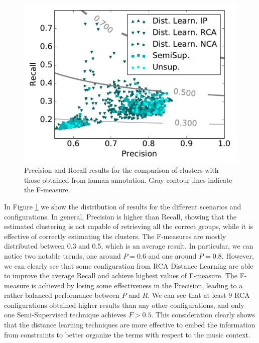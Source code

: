 \begin{figure}[tbp]
  \centering 
     \includegraphics[width=.85\columnwidth]{img/ANEW/F_measure_square.pdf}
  \caption{Precision and Recall results for the comparison of clusters with those obtained from human annotation. Gray contour lines indicate the F-measure.}
  \label{fig:ANEWF_measure}
\end{figure}  

In Figure \ref{fig:ANEWF_measure} we show the distribution of results for the different scenarios and configurations. In general, Precision is higher than Recall, showing that the estimated clustering is not capable of retrieving all the correct groups, while it is effective of correctly estimating the clusters. The F-measures are mostly distributed between 0.3 and 0.5, which is an average result. In particular, we can notice two notable trends, one around $P=0.6$ and one around $P=0.8$.
However, we can clearly see that some configuration from RCA Distance Learning are able to improve the average Recall and achieve highest values of F-measure.  The F-measure is achieved by losing some effectiveness in the Precision, leading to a rather balanced performance between $P$ and $R$. We can see that at least $9$ RCA configurations obtained higher results than any other configurations, and only one Semi-Supervised technique achieves $F>0.5$. This consideration clearly shows that the distance learning techniques are more effective to embed the information from constraints to better organize the terms with respect to the music context. 


